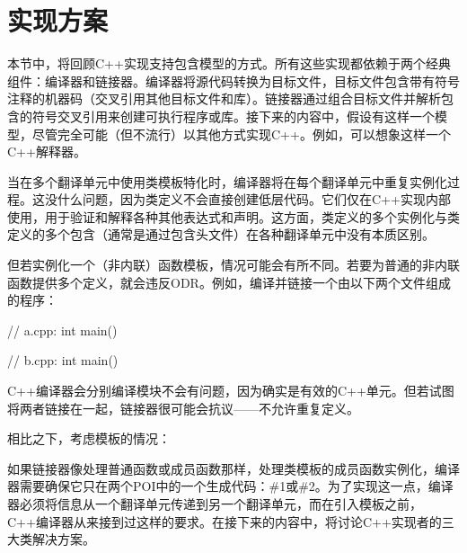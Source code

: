 \section{实现方案}

本节中，将回顾C++实现支持包含模型的方式。所有这些实现都依赖于两个经典组件：编译器和链接器。编译器将源代码转换为目标文件，目标文件包含带有符号注释的机器码（交叉引用其他目标文件和库）。链接器通过组合目标文件并解析包含的符号交叉引用来创建可执行程序或库。接下来的内容中，假设有这样一个模型，尽管完全可能（但不流行）以其他方式实现C++。例如，可以想象这样一个C++解释器。

当在多个翻译单元中使用类模板特化时，编译器将在每个翻译单元中重复实例化过程。这没什么问题，因为类定义不会直接创建低层代码。它们仅在C++实现内部使用，用于验证和解释各种其他表达式和声明。这方面，类定义的多个实例化与类定义的多个包含（通常是通过包含头文件）在各种翻译单元中没有本质区别。

但若实例化一个（非内联）函数模板，情况可能会有所不同。若要为普通的非内联函数提供多个定义，就会违反ODR。例如，编译并链接一个由以下两个文件组成的程序：

\begin{cpp}
// a.cpp:
int main()
{ }

// b.cpp:
int main()
{ }
\end{cpp}

C++编译器会分别编译模块不会有问题，因为确实是有效的C++单元。但若试图将两者链接在一起，链接器很可能会抗议——不允许重复定义。

相比之下，考虑模板的情况：


如果链接器像处理普通函数或成员函数那样，处理类模板的成员函数实例化，编译器需要确保它只在两个POI中的一个生成代码：\#1或\#2。为了实现这一点，编译器必须将信息从一个翻译单元传递到另一个翻译单元，而在引入模板之前，C++编译器从来接到过这样的要求。在接下来的内容中，将讨论C++实现者的三大类解决方案。

